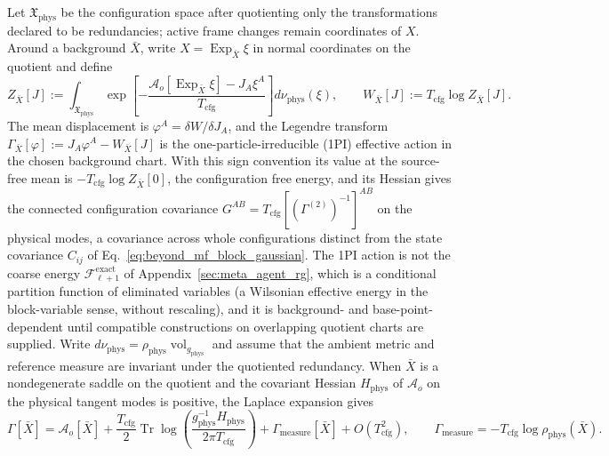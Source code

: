 \documentclass[11pt]{article}
\begin{document}
Let $\mathfrak{X}_{\mathrm{phys}}$ be the configuration space after quotienting only the transformations declared to be redundancies; active frame changes remain coordinates of $X$. Around a background $\bar{X}$, write $X=\operatorname{Exp}_{\bar{X}}\xi$ in normal coordinates on the quotient and define
\begin{equation}
Z_{\bar{X}}[J]
:=\int_{\mathfrak{X}_{\mathrm{phys}}}
\exp\left[-\frac{\mathcal{A}_o[\operatorname{Exp}_{\bar{X}}\xi]-J_A\xi^A}{T_{\mathrm{cfg}}}\right]
d\nu_{\mathrm{phys}}(\xi),
\qquad
W_{\bar{X}}[J]:=T_{\mathrm{cfg}}\log Z_{\bar{X}}[J].
\label{eq:beyond_mf_generating_functional}
\end{equation}
The mean displacement is $\varphi^A=\delta W/\delta J_A$, and the Legendre transform $\Gamma_{\bar{X}}[\varphi]:=J_A\varphi^A-W_{\bar{X}}[J]$ is the one-particle-irreducible (1PI) effective action in the chosen background chart. With this sign convention its value at the source-free mean is $-T_{\mathrm{cfg}}\log Z_{\bar{X}}[0]$, the configuration free energy, and its Hessian gives the connected configuration covariance $G^{AB}=T_{\mathrm{cfg}}[(\Gamma^{(2)})^{-1}]^{AB}$ on the physical modes, a covariance across whole configurations distinct from the state covariance $C_{ij}$ of Eq.~\eqref{eq:beyond_mf_block_gaussian}. The 1PI action is not the coarse energy $\mathcal{F}^{\mathrm{exact}}_{\ell+1}$ of Appendix~\ref{sec:meta_agent_rg}, which is a conditional partition function of eliminated variables (a Wilsonian effective energy in the block-variable sense, without rescaling), and it is background- and base-point-dependent until compatible constructions on overlapping quotient charts are supplied. Write $d\nu_{\mathrm{phys}}=\rho_{\mathrm{phys}}\operatorname{vol}_{g_{\mathrm{phys}}}$ and assume that the ambient metric and reference measure are invariant under the quotiented redundancy. When $\bar{X}$ is a nondegenerate saddle on the quotient and the covariant Hessian $H_{\mathrm{phys}}$ of $\mathcal{A}_o$ on the physical tangent modes is positive, the Laplace expansion gives
\begin{equation}
\Gamma[\bar{X}]
=\mathcal{A}_o[\bar{X}]
+\frac{T_{\mathrm{cfg}}}{2}
\operatorname{Tr}\log\left(\frac{g_{\mathrm{phys}}^{-1}H_{\mathrm{phys}}}{2\pi T_{\mathrm{cfg}}}\right)
+\Gamma_{\mathrm{measure}}[\bar{X}]
+O(T_{\mathrm{cfg}}^2),
\qquad
\Gamma_{\mathrm{measure}}=-T_{\mathrm{cfg}}\log\rho_{\mathrm{phys}}(\bar{X}).
\label{eq:beyond_mf_one_loop}
\end{equation}
\end{document}

